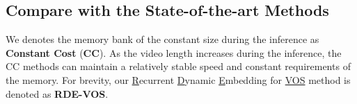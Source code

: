 \documentclass[10pt,twocolumn,letterpaper]{article}
\begin{document}
\begin{table}[t]
	\centering
	\caption{Results on the DAVIS 2017 test set. 600p denotes evaluating on 600p resolution.
}
	\vspace{-1em}
	\label{tab:davis17-test}
\end{table}


\subsection{Compare with the State-of-the-art Methods}
We denotes the memory bank of the constant size during the inference as \textbf{Constant Cost} (\textbf{CC}). As the video length increases during the inference, the CC methods can maintain a relatively stable speed and constant requirements of the memory.
For brevity, our \uline{R}ecurrent \uline{D}ynamic \uline{E}mbedding for  \uline{VOS} method is denoted as \textbf{RDE-VOS}. 
\vspace{-0.7em}
\end{document}

